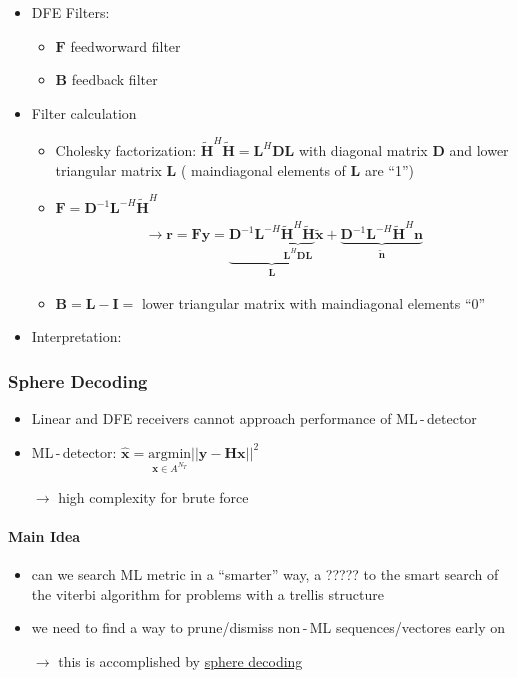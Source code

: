 \documentclass[a4paper, 10pt]{article}
\begin{document}
\begin{itemize}
\begin{figure}
	\end{figure}
	\item DFE Filters:
	\begin{itemize}
		\item $\mathbf{F}$ feedworward filter
		\item $\mathbf{B}$ feedback filter
	\end{itemize}
	\item Filter calculation
	\begin{itemize}
		\item Cholesky factorization: $\tilde{\mathbf{H}}^H \tilde{\mathbf{H}} = \mathbf{L}^H\mathbf{DL}$ with diagonal matrix $\mathbf{D}$
			and lower triangular matrix $\mathbf{L}$ ( maindiagonal elements of $\mathbf{L}$ are ``1'')
		\item $\mathbf{F}=\mathbf{D}^{-1}\mathbf{L}^{-H}\tilde{\mathbf{H}}^H$
		\begin{align*}
			\rightarrow \mathbf{r}=\mathbf{Fy}=\underbrace{\mathbf{D}^{-1}\mathbf{L}^{-H}\underbrace{\tilde{\mathbf{H}}^H\tilde{\mathbf{H}}}_
			{\mathbf{L}^H\mathbf{DL}}}_{\mathbf{L}}\tilde{\mathbf{x}}+\underbrace{\mathbf{D}^{-1}\mathbf{L}^{-H}\tilde{\mathbf{H}}^H\mathbf{n}}_
			{\tilde{\mathbf{n}}}
		\end{align*}
		\item $\mathbf{B}=\mathbf{L-I}=$ lower triangular matrix with maindiagonal elements ``$0$''
	\end{itemize}
	\item Interpretation:
\end{itemize}


\subsubsection{Sphere Decoding}

\begin{itemize}
	\item Linear and DFE receivers cannot approach performance of ML\,-\,detector
	\item ML\,-\,detector: $ \hat{\mathbf{x}} = \underset{\mathbf{x} \in A^{N_T}}{\text{argmin}}||\mathbf{y} - \mathbf{Hx}||^2 $
	\item[$\rightarrow$] high complexity for brute force
\end{itemize}
\paragraph{Main Idea}
\begin{itemize}
	\item can we search ML metric in a ``smarter'' way, a ????? to the smart search of the viterbi algorithm for problems with a trellis structure
	\item we need to find a way to prune/dismiss non\,-\,ML sequences/vectores early on
	\item[$\rightarrow$] this is accomplished by \underline{sphere decoding}	
\end{itemize}
\end{document}
